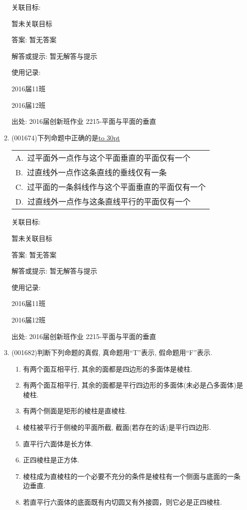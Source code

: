 \documentclass[10pt,a4paper]{article}
\newcommand{\blank}[1]{\underline{\hbox to #1pt{}}}
\newcommand{\onech}[4]{\par\begin{tabular}{p{.9\textwidth}}
A.~#1\\
B.~#2\\
C.~#3\\
D.~#4
\end{tabular}}
\begin{document}
\begin{enumerate}[1.]
关联目标:

暂未关联目标

答案: 暂无答案

解答或提示: 暂无解答与提示

使用记录:

2016届11班	

2016届12班	


出处: 2016届创新班作业	2215-平面与平面的垂直
\item { (001674)}下列命题中正确的是\blank{30}
\onech{过平面外一点作与这个平面垂直的平面仅有一个}{过直线外一点作这条直线的垂线仅有一条}{过平面的一条斜线作与这个平面垂直的平面仅有一个}{过直线外一点作与这条直线平行的平面仅有一个}


关联目标:

暂未关联目标

答案: 暂无答案

解答或提示: 暂无解答与提示

使用记录:

2016届11班	

2016届12班	


出处: 2016届创新班作业	2215-平面与平面的垂直
\item { (001682)}判断下列命题的真假, 真命题用``{\textrm T}''表示, 假命题用``{\textrm F}''表示.\\ 
\begin{enumerate}[\blank{30}(1)]
\item 有两个面互相平行, 其余的面都是四边形的多面体是棱柱.\\ 
\item 有两个面互相平行, 其余的面都是平行四边形的多面体(未必是凸多面体)是棱柱.\\ 
\item 有两个侧面是矩形的棱柱是直棱柱.\\ 
\item 棱柱被平行于侧棱的平面所截, 截面(若存在的话)是平行四边形.\\ 
\item 直平行六面体是长方体.\\ 
\item 正四棱柱是正方体.\\ 
\item 棱柱成为直棱柱的一个必要不充分的条件是棱柱有一个侧面与底面的一条边垂直.\\ 
\item 若直平行六面体的底面既有内切圆又有外接圆，则它必是正四棱柱.\\ 
\end{enumerate}



\end{enumerate}
\end{document}
